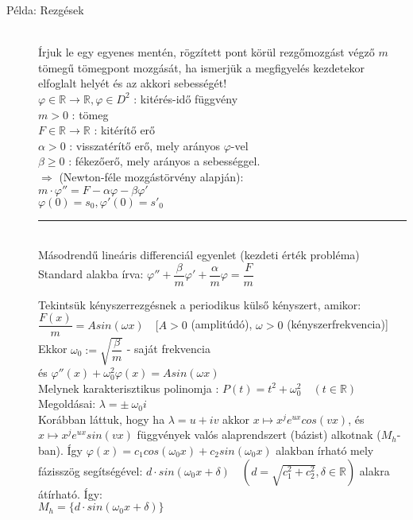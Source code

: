 \documentclass[margin=0px]{article}
\newcommand{\R}{\mathbb{R}}
\begin{document}
\begin{description}
    \item[Példa: Rezgések] \hfill \\
        Írjuk le egy egyenes mentén, rögzített pont körül rezgőmozgást végző $m$ tömegű tömegpont mozgását, ha ismerjük a megfigyelés kezdetekor elfoglalt helyét és az akkori sebességét! \\
        $ \varphi \in \R \rightarrow \R, \varphi \in D^2$ : kitérés-idő függvény \\
        $ m > 0 $ : tömeg \\
        $ F \in \R \rightarrow \R $ : kitérítő erő \\
        $ \alpha > 0 $ : visszatérítő erő, mely arányos $ \varphi $-vel \\
        $ \beta \geq 0 $ : fékezőerő, mely arányos a sebességgel. \\
        $ \Longrightarrow $ (Newton-féle mozgástörvény alapján):\\
        $ m \cdot \varphi'' = F - \alpha\varphi-\beta\varphi'$\\
        $ \varphi(0) = s_0, \varphi'(0) = s'_0 $\\
        \rule{4cm}{0.2pt} \\
        Másodrendű lineáris differenciál egyenlet (kezdeti érték probléma)\\
        Standard alakba írva: $ \varphi'' + \dfrac{\beta}{m}\varphi' + \dfrac{\alpha}{m}\varphi = \dfrac{F}{m} $

        Tekintsük kényszerrezgésnek a periodikus külső kényszert, amikor: \\
        $ \dfrac{F(x)}{m} = Asin(\omega x )  \quad [A>0$ (amplitúdó), $ \omega > 0$ (kényszerfrekvencia)] \\
            Ekkor $ \omega_0 := \sqrt{\dfrac{\beta}{m}} $ - saját frekvencia\\
            és $\varphi''(x) + \omega_0^2\varphi(x) = Asin(\omega x) $ \\
            Melynek karakterisztikus polinomja : $ P(t) = t^2+\omega_0^2 \quad (t \in \R) $ \\
            Megoldásai: $ \lambda = \pm \ \omega_0i $ \\

            Korábban láttuk, hogy ha $ \lambda = u+iv$ akkor $ x \mapsto x^je^{ux}cos(vx)$, és $x \mapsto x^je^{ux}sin(vx)$ függvények valós alaprendszert (bázist) alkotnak ($M_h$-ban). Így $ \varphi(x) = c_1cos(\omega_0x) + c_2sin(\omega_0x) $ alakban írható mely fázisszög segítségével: $ d\cdot sin(\omega_0x+\delta) \quad (d = \sqrt{c_1^2+c_2^2}, \delta \in \R)$ alakra átírható. Így: \\
        $ M_h =  \{ d\cdot sin(\omega_0x+\delta)\}$


\end{description}
\end{document}
